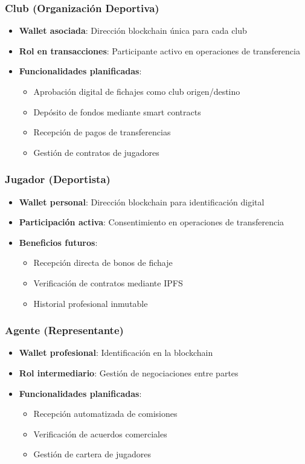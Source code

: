 \documentclass[12pt,a4paper]{article}
\begin{document}
	\subsubsection{Club (Organización Deportiva)}
	\begin{itemize}
		\item \textbf{Wallet asociada}: Dirección blockchain única para cada club
		\item \textbf{Rol en transacciones}: Participante activo en operaciones de transferencia
		\item \textbf{Funcionalidades planificadas}:
		\begin{itemize}
			\item Aprobación digital de fichajes como club origen/destino
			\item Depósito de fondos mediante smart contracts
			\item Recepción de pagos de transferencias
			\item Gestión de contratos de jugadores
		\end{itemize}
	\end{itemize}
	
	\subsubsection{Jugador (Deportista)}
	\begin{itemize}
		\item \textbf{Wallet personal}: Dirección blockchain para identificación digital
		\item \textbf{Participación activa}: Consentimiento en operaciones de transferencia
		\item \textbf{Beneficios futuros}:
		\begin{itemize}
			\item Recepción directa de bonos de fichaje
			\item Verificación de contratos mediante IPFS
			\item Historial profesional inmutable
		\end{itemize}
	\end{itemize}
	
	\subsubsection{Agente (Representante)}
	\begin{itemize}
		\item \textbf{Wallet profesional}: Identificación en la blockchain
		\item \textbf{Rol intermediario}: Gestión de negociaciones entre partes
		\item \textbf{Funcionalidades planificadas}:
		\begin{itemize}
			\item Recepción automatizada de comisiones
			\item Verificación de acuerdos comerciales
			\item Gestión de cartera de jugadores
		\end{itemize}
	\end{itemize}
	
\end{document}
